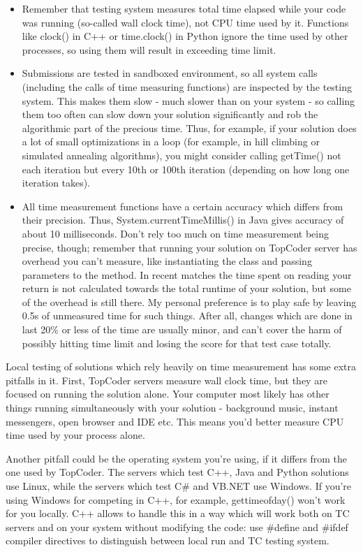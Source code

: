 \documentclass[]{article}
\begin{document}
\begin{itemize}
\item
  Remember that testing system measures total time elapsed while your
  code was running (so-called wall clock time), not CPU time used by it.
  Functions like clock() in C++ or time.clock() in Python ignore the
  time used by other processes, so using them will result in exceeding
  time limit.
\item
  Submissions are tested in sandboxed environment, so all system calls
  (including the calls of time measuring functions) are inspected by the
  testing system. This makes them slow - much slower than on your system
  - so calling them too often can slow down your solution significantly
  and rob the algorithmic part of the precious time. Thus, for example,
  if your solution does a lot of small optimizations in a loop (for
  example, in hill climbing or simulated annealing algorithms), you
  might consider calling getTime() not each iteration but every 10th or
  100th iteration (depending on how long one iteration takes).
\item
  All time measurement functions have a certain accuracy which differs
  from their precision. Thus, System.currentTimeMillis() in Java gives
  accuracy of about 10 milliseconds. Don't rely too much on time
  measurement being precise, though; remember that running your solution
  on TopCoder server has overhead you can't measure, like instantiating
  the class and passing parameters to the method. In recent matches the
  time spent on reading your return is not calculated towards the total
  runtime of your solution, but some of the overhead is still there. My
  personal preference is to play safe by leaving 0.5s of unmeasured time
  for such things. After all, changes which are done in last 20\% or
  less of the time are usually minor, and can't cover the harm of
  possibly hitting time limit and losing the score for that test case
  totally.
\end{itemize}

Local testing of solutions which rely heavily on time measurement has
some extra pitfalls in it. First, TopCoder servers measure wall clock
time, but they are focused on running the solution alone. Your computer
most likely has other things running simultaneously with your solution -
background music, instant messengers, open browser and IDE etc. This
means you'd better measure CPU time used by your process alone.

Another pitfall could be the operating system you're using, if it
differs from the one used by TopCoder. The servers which test C++, Java
and Python solutions use Linux, while the servers which test C\# and
VB.NET use Windows. If you're using Windows for competing in C++, for
example, gettimeofday() won't work for you locally. C++ allows to handle
this in a way which will work both on TC servers and on your system
without modifying the code: use \#define and \#ifdef compiler directives
to distinguish between local run and TC testing system.
\end{document}
